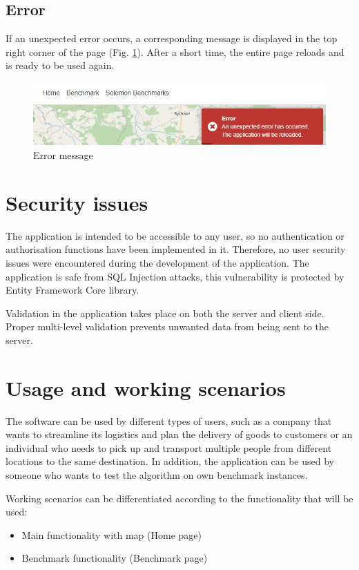 \documentclass[a4paper,twoside,12pt]{book}
\begin{document}
\subsection{Error}

If an unexpected error occurs, a corresponding message is displayed in the top right corner of the page (Fig. \ref{fig:error}). After a short time, the entire page reloads and is ready to be used again.

\begin{figure}[H]
\centering
\includegraphics[scale=0.7]{images/error.jpg}
\caption{Error message}
\label{fig:error}
\end{figure}


\section{Security issues}
The application is intended to be accessible to any user, so no authentication or authorisation functions have been implemented in it. Therefore, no user security issues were encountered during the development of the application. The application is safe from SQL Injection attacks, this vulnerability is protected by Entity Framework Core library.

Validation in the application takes place on both the server and client side. Proper multi-level validation prevents unwanted data from being sent to the server.

\section{Usage and working scenarios}
The software can be used by different types of users, such as a company that wants to streamline its logistics and plan the delivery of goods to customers or an individual who needs to pick up and transport multiple people from different locations to the same destination. In addition, the application can be used by someone who wants to test the algorithm on own benchmark instances.

Working scenarios can be differentiated according to the functionality that will be used:

\begin{itemize}
    \item Main functionality with map (Home page)
    \item Benchmark functionality (Benchmark page)
\end{itemize}
\end{document}
